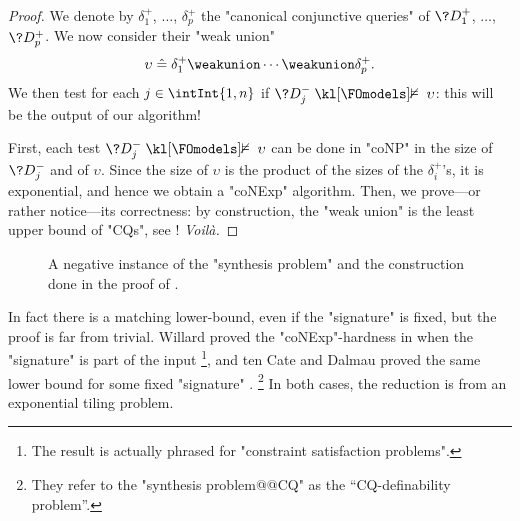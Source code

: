\begin{proof}
	We denote by $\delta^+_1$, $\dotsc$, $\delta^+_p$ the "canonical conjunctive queries"
	of $\?D^+_1$, $\dotsc$, $\?D^+_p$.
	We now consider their "weak union"
	\[
		\upsilon \defeq \delta^+_1 \weakunion \cdots \weakunion \delta^+_p.
	\]
	We then test for each $j\in \intInt{1,n}$ if 
	$\?D^-_j \notFOmodels \upsilon$: this will be
	the output of our algorithm!
	
	First, each test $\?D^-_j \notFOmodels \upsilon$
	can be done in "coNP" in the size of $\?D^-_j$ and of
	$\upsilon$. Since the size of $\upsilon$ is the product of
	the sizes of the $\delta^+_i$'s, it is exponential,
	and hence we obtain a "coNExp" algorithm.
	Then, we prove---or rather notice---its correctness: by construction,
	the "weak union" is the least upper bound of "CQs",
	see ! \emph{Voilà.}
\end{proof}
\begin{figure}
	\centering
	\caption{
		\AP\label{fig:ex-synthesis-cq-negative}
		A negative instance of the "synthesis problem" and the construction
		done in the proof of .
	}
\end{figure}

In fact there is a matching lower-bound, even if the "signature" is fixed,
but the  proof is far from trivial.
Willard proved the "coNExp"-hardness in
\cite[Theorem~3]{Willard2010Testing} when the "signature" is part of the input%
\footnote{The result is actually phrased for "constraint satisfaction problems".},
and ten Cate and Dalmau proved the same lower bound
for some fixed "signature" \cite[Theorem~2]{tenCateDalmau2015Product}.%
\footnote{They refer to the "synthesis problem@@CQ" as the ``CQ-definability problem''.}
In both cases, the reduction is from an exponential tiling problem.

